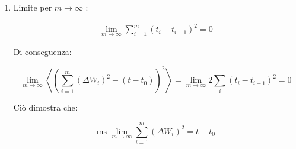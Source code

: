 \begin{enumerate}
    
    Per incrementi indipendenti ($i \neq j$):
    
    $$
    \sum_{i \neq j}\langle(\Delta W_{i})^{2}(\Delta W_{j})^{2}\rangle = \sum_{i \neq j}\langle(\Delta W_{i})^{2}\rangle \langle(\Delta W_{j})^{2}\rangle = \sum_{i \neq j}\Delta t_i \Delta t_j
    $$
    
    Per un processo di Wiener Gaussiano, $\langle(\Delta W_{i})^{2}\rangle = \Delta t_i$ e il quarto momento è:
    
    $$
     \langle(\Delta W_{i})^{4}\rangle = 3(\Delta t_i)^2
    $$
    
    Quindi:
    

    \begin{equation}
    \left\langle \left( \sum_{i}(\Delta W_{i})^{2} \right)^{2} \right\rangle = \sum_{i}3(\Delta t_i)^{2} + \sum_{i \neq j}\Delta t_i \Delta t_j
    \end{equation}

    
    Riscrivendo: 
    
    $$
    \sum_{i \neq j}\Delta t_i \Delta t_j = (\sum_{k}\Delta t_k)^2 - \sum_{k}(\Delta t_k)^2 = (t-t_0)^2 - \sum_k (\Delta t_k)^2
    $$
    

    \begin{align}
    \left\langle \left( \sum_{i}(\Delta W_{i})^{2} \right)^{2} \right\rangle &= 3\sum_{i}(\Delta t_i)^{2} + (t-t_0)^2 - \sum_{i}(\Delta t_i)^{2} \nonumber \\
    &= 2\sum_{i}(\Delta t_i)^{2} + (t-t_0)^{2}
    \end{align}

    
    Sostituendo questo nell'espressione per $\left\langle \left( \sum_{i=1}^m (\Delta W_i)^2 - (t-t_0) \right)^2 \right\rangle$:
    

    \begin{align}
    \left\langle \left( \sum_{i=1}^m (\Delta W_i)^2 - (t-t_0) \right)^2 \right\rangle &= \left[ 2\sum_{i}(t_i-t_{i-1})^2 + (t-t_0)^2 \right] - (t-t_0)^2 \nonumber \\
    &= 2\sum_{i}(t_i-t_{i-1})^2
    \end{align}

    
\item Limite per $m \rightarrow \infty$ :
    

    \begin{align}
    \lim_{m\rightarrow\infty} \sum_{i=1}^m (t_i-t_{i-1})^2 = 0
    \end{align}

    
    Di conseguenza:
    

    \begin{equation}
    \lim_{m\rightarrow\infty} \left\langle \left( \sum_{i=1}^m (\Delta W_i)^2 - (t-t_0) \right)^2 \right\rangle = \lim_{m\rightarrow\infty} 2\sum_{i}(t_i-t_{i-1})^2 = 0
    \end{equation}

    
    Ciò dimostra che:
    
    $$
    \text{ms-}\lim_{m\rightarrow\infty} \sum_{i=1}^m (\Delta W_i)^2 = t-t_0
    $$
\end{enumerate} 

